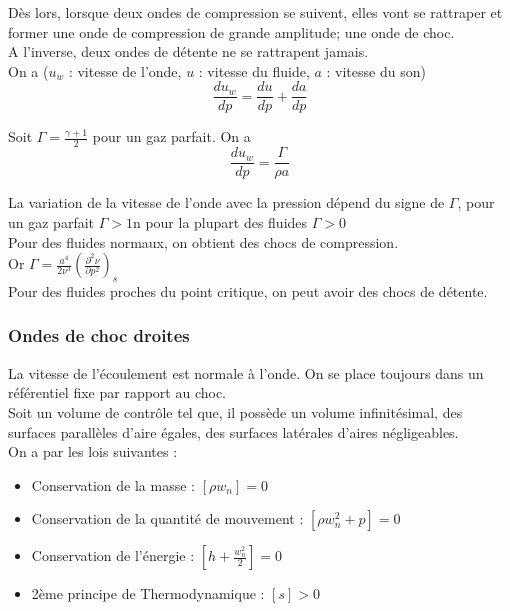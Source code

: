 \documentclass[../main.tex]{subfiles}
\begin{document}
Dès lors, lorsque deux ondes de compression se suivent, elles vont se rattraper et former une onde de compression de grande amplitude; une onde de choc.\\
A l'inverse, deux ondes de détente ne se rattrapent jamais.\\

On a ($u_w$ : vitesse de l'onde, $u$ : vitesse du fluide, $a$ : vitesse du son) \begin{equation}
    \frac{du_w}{dp} = \frac{du}{dp} + \frac{da}{dp}
\end{equation}

Soit $\Gamma = \frac{\gamma+1}{2}$ pour un gaz parfait. On a \begin{equation}\frac{du_w}{dp} = \frac{\Gamma}{\rho a}\end{equation}

La variation de la vitesse de l'onde avec la pression dépend du signe de $\Gamma$, pour un gaz parfait $\Gamma > 1$n pour la plupart des fluides $\Gamma > 0$\\
Pour des fluides normaux, on obtient des chocs de compression.\\

Or $\Gamma = \frac{a^4}{2\nu^3} (\frac{\partial^2 \nu}{\partial p^2})_s$\\
Pour des fluides proches du point critique, on peut avoir des chocs de détente.\\

\subsubsection{Ondes de choc droites}
La vitesse de l'écoulement est normale à l'onde. On se place toujours dans un référentiel fixe par rapport au choc.\\

Soit un volume de contrôle tel que, il possède un volume infinitésimal, des surfaces parallèles d'aire égales, des surfaces latérales d'aires négligeables.\\

On a par les lois suivantes : \begin{itemize}
    \item Conservation de la masse : $[\rho w_n] = 0$\\
    \item Conservation de la quantité de mouvement : $[\rho w_n^2 + p] = 0$\\
    \item Conservation de l'énergie : $[h + \frac{w_n^2}{2}] = 0$\\
    \item 2ème principe de Thermodynamique : $[s]>0$\\
\end{itemize}
\end{document}
